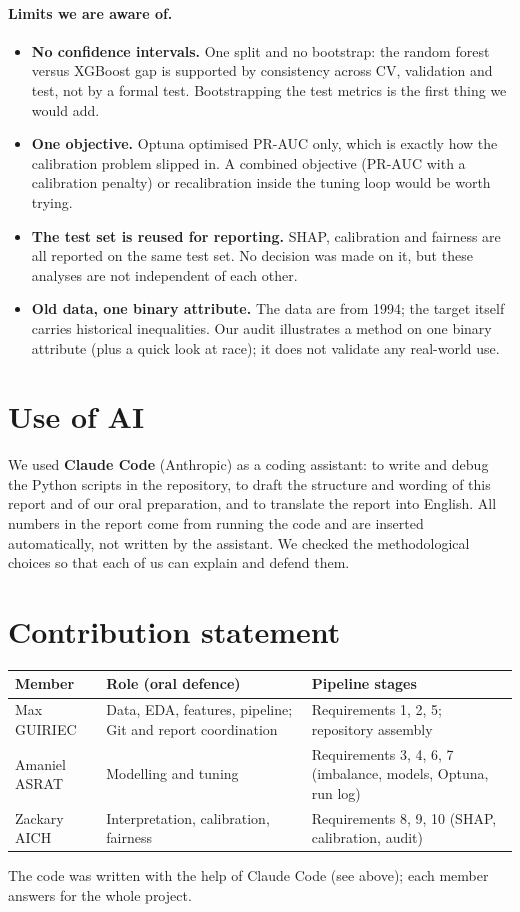 \documentclass[11pt,a4paper]{article}
\begin{document}
\paragraph{Limits we are aware of.}
\begin{itemize}
\item \textbf{No confidence intervals.} One split and no bootstrap: the random forest versus XGBoost gap is supported by consistency across CV, validation and test, not by a formal test. Bootstrapping the test metrics is the first thing we would add.
\item \textbf{One objective.} Optuna optimised PR-AUC only, which is exactly how the calibration problem slipped in. A combined objective (PR-AUC with a calibration penalty) or recalibration inside the tuning loop would be worth trying.
\item \textbf{The test set is reused for reporting.} SHAP, calibration and fairness are all reported on the same test set. No decision was made on it, but these analyses are not independent of each other.
\item \textbf{Old data, one binary attribute.} The data are from 1994; the target itself carries historical inequalities. Our audit illustrates a method on one binary attribute (plus a quick look at race); it does not validate any real-world use.
\end{itemize}

\section*{Use of AI}
We used \textbf{Claude Code} (Anthropic) as a coding assistant: to write and debug the Python scripts in the repository, to draft the structure and wording of this report and of our oral preparation, and to translate the report into English. All numbers in the report come from running the code and are inserted automatically, not written by the assistant. We checked the methodological choices so that each of us can explain and defend them.

\section*{Contribution statement}
\begin{center}\small
\begin{tabular}{p{3.6cm}p{5.6cm}p{5.8cm}}\toprule
Member & Role (oral defence) & Pipeline stages \\ \midrule
Max GUIRIEC & Data, EDA, features, pipeline; Git and report coordination & Requirements 1, 2, 5; repository assembly \\
Amaniel ASRAT & Modelling and tuning & Requirements 3, 4, 6, 7 (imbalance, models, Optuna, run log) \\
Zackary AICH & Interpretation, calibration, fairness & Requirements 8, 9, 10 (SHAP, calibration, audit) \\ \bottomrule
\end{tabular}
\end{center}
The code was written with the help of Claude Code (see above); each member answers for the whole project.
\end{document}
